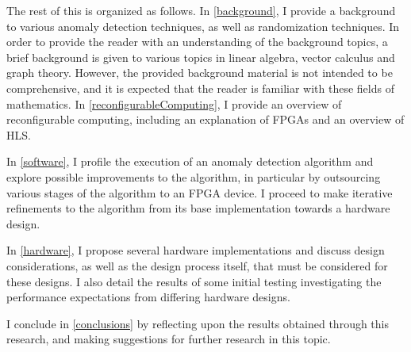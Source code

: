 The rest of this \thesis{} is organized as follows. In \autoref{background}, I
provide a background to various anomaly detection techniques, as well as
randomization techniques. In order to provide the reader with an understanding
of the background topics, a brief background is given to various topics in
linear algebra, vector calculus and graph theory. However, the provided
background material is not intended to be comprehensive, and it is expected that
the reader is familiar with these fields of mathematics. In
\autoref{reconfigurableComputing}, I provide an overview of reconfigurable
computing, including an explanation of \glspl{FPGA} and an overview of
\gls{HLS}.

In \autoref{software}, I profile the execution of an anomaly detection algorithm
and explore possible improvements to the algorithm, in particular by outsourcing
various stages of the algorithm to an FPGA device. I proceed to make iterative
refinements to the algorithm from its base implementation towards a hardware
design.

In \autoref{hardware}, I propose several hardware implementations and discuss
design considerations, as well as the design process itself, that must be
considered for these designs. I also detail the results of some initial testing
investigating the performance expectations from differing hardware designs.

I conclude in \autoref{conclusions} by reflecting upon the results obtained
through this research, and making suggestions for further research in this
topic.
